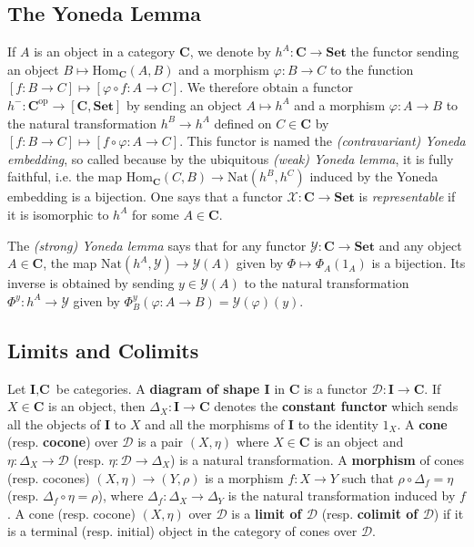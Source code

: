 \documentclass[oneside,11pt]{amsart}
\newcommand{\bC}{\ensuremath{\textbf{C}}}
\newcommand{\bI}{\ensuremath{\textbf{I}}}
\newcommand{\bSet}{\ensuremath{\textbf{Set}}}
\newcommand{\mX}{\ensuremath{\mathcal{X}}}
\newcommand{\mY}{\ensuremath{\mathcal{Y}}}
\newcommand{\mD}{\ensuremath{\mathcal{D}}}
\newcommand{\Hom}{\ensuremath{\text{Hom}}}
\newcommand{\Nat}{\ensuremath{\text{Nat}}}
\newcommand{\op}{\ensuremath{\text{op}}}
\theoremstyle{definition}
\newtheorem{proof techniques}{Proof Techniques}
\begin{document}

\subsection{The Yoneda Lemma} 

If $A$ is an object in a category $\bC$, we denote by $h^A: \bC \to \textbf{Set}$ the functor sending an object $B \mapsto \text{Hom}_\bC(A , B)$ and a morphism $\varphi: B \to C$ to the function $[f: B \to C] \mapsto [\varphi \circ f : A \to C]$. We therefore obtain a functor $h^- : \bC^\op \to [\bC, \bSet]$ by sending an object $A \mapsto h^A$ and a morphism $\varphi: A \to B$ to the natural transformation $h^B \to h^A$ defined on $C \in \bC$ by $[f : B \to C] \mapsto [f \circ \varphi : A \to C]$. This functor is named the \emph{(contravariant) Yoneda embedding}, so called because by the ubiquitous \emph{(weak) Yoneda lemma}, it is fully faithful, i.e. the map $\Hom_\bC(C , B) \to \Nat(h^B , h^C)$ induced by the Yoneda embedding is a bijection. One says that a functor $\mX : \bC \to \bSet$ is \emph{representable} if it is isomorphic to $h^A$ for some $A \in \bC$. 

The \emph{(strong) Yoneda lemma} says that for any functor $\mY : \bC \to \bSet$ and any object $A \in \bC$, the map $\Nat(h^A, \mY ) \to \mY(A)$ given by $\Phi \mapsto \Phi_A(1_A)$ is a bijection. Its inverse is obtained by sending $y \in \mY(A)$ to the natural transformation $\Phi^y : h^A \to \mY$ given by $\Phi^y_B( \varphi : A \to B ) = \mY(\varphi)(y)$. 


\subsection{Limits and Colimits}

Let $\bI, \bC$ be categories. A \textbf{diagram of shape $\bI$} in $\bC$ is a functor $\mD : \bI \to \bC$. If $X \in \bC$ is an object, then $\Delta_X : \bI \to \bC$ denotes the \textbf{constant functor} which sends all the objects of $\bI$ to $X$ and all the morphisms of $\bI$ to the identity $1_X$. A \textbf{cone} (resp. \textbf{cocone}) over $\mD$ is a pair $(X , \eta)$ where $X \in \bC$ is an object and $\eta : \Delta_X \to \mD$ (resp. $\eta : \mD \to \Delta_X$) is a natural transformation. A \textbf{morphism} of cones (resp. cocones) $(X , \eta) \to (Y , \rho)$ is a morphism $f : X \to Y$ such that $\rho \circ \Delta_f = \eta$ (resp. $\Delta_f \circ \eta = \rho$), where $\Delta_f : \Delta_X \to \Delta_Y$ is the natural transformation induced by $f$. A cone (resp. cocone) $(X , \eta)$ over $\mD$ is a \textbf{limit of $\mD$} (resp. \textbf{colimit of $\mD$}) if it is a terminal (resp. initial) object in the category of cones over $\mD$. 
\end{document}
